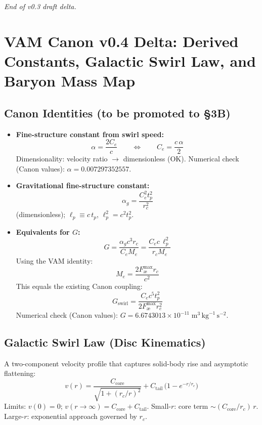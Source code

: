 \documentclass[11pt]{article}
\begin{document}
    \textit{End of v0.3 draft delta.}









    \section{VAM Canon v0.4 Delta: Derived Constants, Galactic Swirl Law, and Baryon Mass Map}
    \label{sec:vam-canon-v0.4-delta}

    \subsection{Canon Identities (to be promoted to \S3B)}
    \begin{itemize}
        \item \textbf{Fine-structure constant from swirl speed:}
        \[
            \boxed{\alpha = \frac{2 C_e}{c}} \qquad \Longleftrightarrow \qquad \boxed{C_e = \frac{c\,\alpha}{2}}
        \]
        Dimensionality: velocity ratio $\rightarrow$ dimensionless (OK). Numerical check (Canon values): $\alpha=0.007297352557$.

        \item \textbf{Gravitational fine-structure constant:}
        \[
            \boxed{\alpha_g = \frac{C_e^{2} t_p^{2}}{r_c^{2}}}
        \]
        (dimensionless); $\ell_p \equiv c\,t_p$, $\ell_p^{2}=c^{2}t_p^{2}$.

        \item \textbf{Equivalents for $G$:}
        \[
            \boxed{G = \frac{\alpha_g c^{3} r_c}{C_e M_e} = \frac{C_e c\, \ell_p^{2}}{r_c M_e}}
        \]
        Using the VAM identity:
        \[
            \boxed{M_e = \frac{2 F_{\text{\ae}}^{\max} r_c}{c^{2}}}
        \]
        This equals the existing Canon coupling:
        \[
            \boxed{G_{\text{swirl}}=\frac{C_e c^{5} t_p^{2}}{2 F_{\text{\ae}}^{\max} r_c^{2}}}
        \]
        Numerical check (Canon values): $G=6.6743013\times10^{-11}\;\text{m}^3\,\text{kg}^{-1}\,\text{s}^{-2}$.
    \end{itemize}

    \subsection{Galactic Swirl Law (Disc Kinematics)}
    A two-component velocity profile that captures solid-body rise and asymptotic flattening:
    \[
        \boxed{v(r) = \frac{C_{\text{core}}}{\sqrt{1 + (r_c/r)^2}} + C_{\text{tail}}\,\big(1 - e^{-r/r_c}\big)}
    \]
    Limits: $v(0)=0$; $v(r\to\infty)=C_{\text{core}}+C_{\text{tail}}$. Small-$r$: core term $\sim (C_{\text{core}}/r_c)\,r$. Large-$r$: exponential approach governed by $r_c$.
\end{document}
